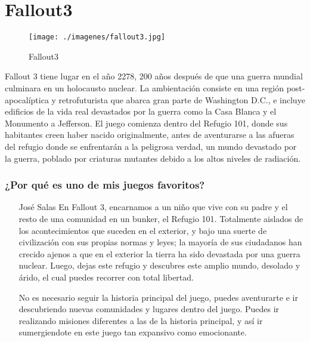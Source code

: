 \section{Fallout3}

\begin{figure}[htbp]
\begin{center}
\texttt{[image: ./imagenes/fallout3.jpg]}
\caption{Fallout3}
\label{Fallout3}
\end{center}
\end{figure}
Fallout 3 tiene lugar en el año 2278, 200 años después de que una guerra mundial culminara en un holocausto nuclear. La ambientación consiste en una región post-apocalíptica y retrofuturista que abarca gran parte de Washington D.C., e  incluye edificios de la vida real devastados por la guerra como la Casa Blanca y el Monumento a Jefferson. El juego comienza dentro del Refugio 101, donde sus habitantes creen haber nacido originalmente, antes de aventurarse a las afueras del refugio donde se enfrentarán a la peligrosa verdad, un mundo devastado por la guerra, poblado por criaturas mutantes debido a los altos niveles de radiación.  

\subsubsection{¿Por qué es uno de mis juegos favoritos?}
\begin{itemize}
\item[José Salas] En Fallout 3, encarnamos a un niño que vive con su padre y el resto de una comunidad en un bunker, el Refugio 101. Totalmente aislados de los acontecimientos que suceden en el exterior, y bajo una suerte de civilización con sus propias normas y leyes; la mayoría de sus ciudadanos han crecido ajenos a que en el exterior la tierra ha sido devastada por una guerra nuclear. Luego, dejas este refugio y descubres este amplio mundo, desolado y árido, el cual puedes recorrer con total libertad.

 No es necesario seguir la historia principal del juego, puedes aventurarte e ir descubriendo nuevas comunidades y lugares dentro del juego. Puedes ir realizando misiones diferentes a las de la historia principal, y así ir sumergiendote en este juego tan expansivo como emocionante.   

\end{itemize}
